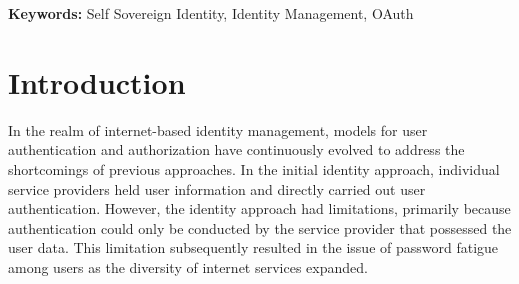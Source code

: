 \vspace{0.5cm}
\textbf{Keywords:} Self Sovereign Identity, Identity Management, OAuth

\section*{Introduction}


In the realm of internet-based identity management, models for user authentication and authorization have continuously evolved to address the shortcomings of previous approaches. In the initial identity approach, individual service providers held user information and directly carried out user authentication. However, the identity approach had limitations, primarily because authentication could only be conducted by the service provider that possessed the user data. This limitation subsequently resulted in the issue of password fatigue among users as the diversity of internet services expanded.

